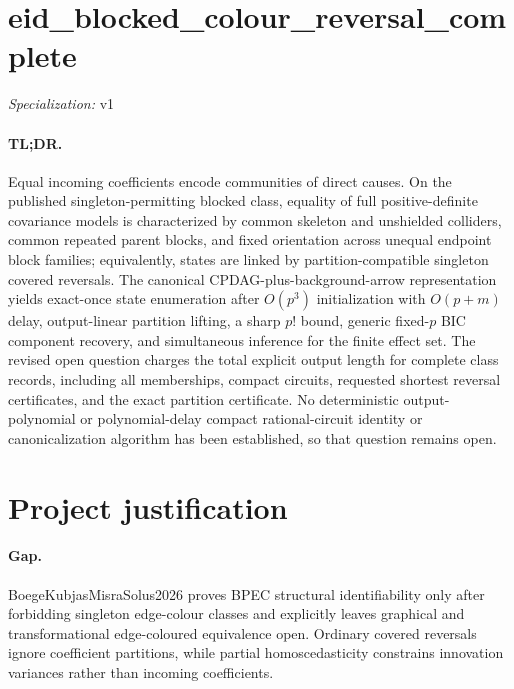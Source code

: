 \documentclass{article}
\begin{document}
\sloppy

\section*{eid\_\allowbreak{}blocked\_\allowbreak{}colour\_\allowbreak{}reversal\_\allowbreak{}complete}

\noindent\textit{Specialization:} v1\par

\paragraph{TL;DR.} Equal incoming coefficients encode communities of direct causes. On the published singleton-permitting blocked class, equality of full positive-definite covariance models is characterized by common skeleton and unshielded colliders, common repeated parent blocks, and fixed orientation across unequal endpoint block families; equivalently, states are linked by partition-compatible singleton covered reversals. The canonical CPDAG-plus-background-arrow representation yields exact-once state enumeration after \(O(p^3)\) initialization with \(O(p+m)\) delay, output-linear partition lifting, a sharp \(p!\) bound, generic fixed-\(p\) BIC component recovery, and simultaneous inference for the finite effect set. The revised open question charges the total explicit output length for complete class records, including all memberships, compact circuits, requested shortest reversal certificates, and the exact partition certificate. No deterministic output-polynomial or polynomial-delay compact rational-circuit identity or canonicalization algorithm has been established, so that question remains open.

\section{Project justification}

\paragraph{Gap.} BoegeKubjasMisraSolus2026 proves BPEC structural identifiability only after forbidding singleton edge-colour classes and explicitly leaves graphical and transformational edge-coloured equivalence open. Ordinary covered reversals ignore coefficient partitions, while partial homoscedasticity constrains innovation variances rather than incoming coefficients.
\end{document}
